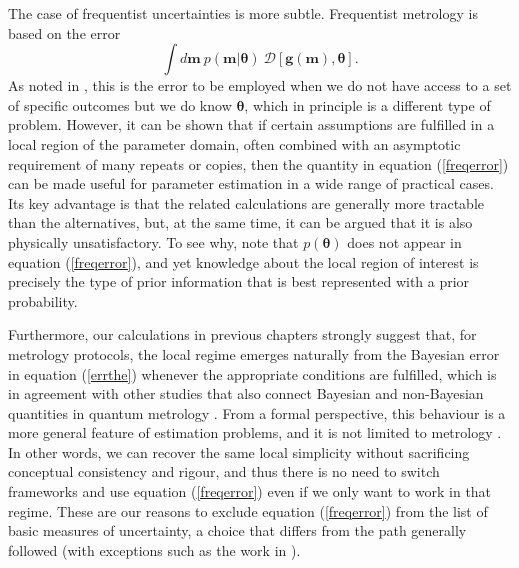 The case of frequentist uncertainties is more subtle. Frequentist metrology is based on the error \cite{paris2009, rafal2015, li2018}
\begin{equation}
\int d\boldsymbol{m}~p(\boldsymbol{m}|\boldsymbol{\theta}) ~\mathcal{D}[\boldsymbol{g}(\boldsymbol{m}),\boldsymbol{\theta}].
\label{freqerror}
\end{equation}
As noted in \cite{jaynes2003}, this is the error to be employed when we do not have access to a set of specific outcomes but we do know $\boldsymbol{\theta}$, which in principle is a different type of problem. However, it can be shown \cite{hall2012, rafal2015, kolodynski2014, haase2018jul} that if certain assumptions are fulfilled in a local region of the parameter domain, often combined with an asymptotic requirement of many repeats or copies, then the quantity in equation (\ref{freqerror}) can be made useful for parameter estimation in a wide range of practical cases. Its key advantage is that the related calculations are generally more tractable than the alternatives, but, at the same time, it can be argued that it is also physically unsatisfactory. To see why, note that $p(\boldsymbol{\theta})$ does not appear in equation (\ref{freqerror}), and yet knowledge about the local region of interest is precisely the type of prior information that is best represented with a prior probability. 

Furthermore, our calculations in previous chapters strongly suggest that, for metrology protocols, the local regime emerges naturally from the Bayesian error in equation (\ref{errthe}) whenever the appropriate conditions are fulfilled, which is in agreement with other studies that also connect Bayesian and non-Bayesian quantities in quantum metrology \cite{jarzyna2015true}. From a formal perspective, this behaviour is a more general feature of estimation problems, and it is not limited to metrology \cite{gill2011}. In other words, we can recover the same local simplicity without sacrificing conceptual consistency and rigour, and thus there is no need to switch frameworks and use equation (\ref{freqerror}) even if we only want to work in that regime. These are our reasons to exclude equation (\ref{freqerror}) from the list of basic measures of uncertainty, a choice that differs from the path generally followed \cite{paris2009, rafal2015, li2018} (with exceptions such as the work in \cite{hall2012}). 

